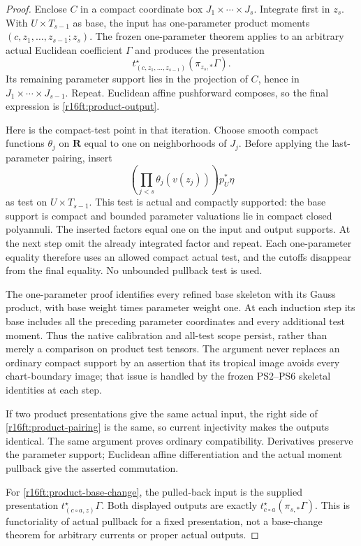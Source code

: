 \begin{proof}
Enclose $C$ in a compact coordinate box $J_1\times\cdots\times J_s$.
Integrate first in $z_s$. With $U\times T_{s-1}$ as base, the input has
one-parameter product moments $(c,z_1,\ldots,z_{s-1};z_s)$.
The frozen one-parameter theorem applies to an arbitrary actual
Euclidean coefficient $\Gamma$ and produces the presentation
\[
 t_{(c,z_1,\ldots,z_{s-1})}^\star(\pi_{z_s,*}\Gamma).
\]
Its remaining parameter support lies in the projection of $C$, hence
in $J_1\times\cdots\times J_{s-1}$. Repeat. Euclidean affine
pushforward composes, so the final expression is
\eqref{r16ft:product-output}.

Here is the compact-test point in that iteration. Choose smooth compact
functions $\theta_j$ on $\mathbf R$ equal to one on neighborhoods of
$J_j$. Before applying the last-parameter pairing, insert
\[
 \left(\prod_{j<s}\theta_j(v(z_j))\right)p_U^*\eta
\]
as test on $U\times T_{s-1}$. This test is actual and compactly
supported: the base support is compact and bounded parameter valuations
lie in compact closed polyannuli. The inserted factors equal one on
the input and output supports. At the next step omit the already
integrated factor and repeat. Each one-parameter equality therefore
uses an allowed compact actual test, and the cutoffs disappear from
the final equality. No unbounded pullback test is used.

The one-parameter proof identifies every refined base skeleton with
its Gauss product, with base weight times parameter weight one. At
each induction step its base includes all the preceding parameter
coordinates and every additional test moment. Thus the native
calibration and all-test scope persist, rather than merely a comparison
on product test tensors. The argument never replaces an ordinary
compact support by an assertion that its tropical image avoids every
chart-boundary image; that issue is handled by the frozen PS2--PS6
skeletal identities at each step.

If two product presentations give the same actual input, the right
side of \eqref{r16ft:product-pairing} is the same, so current
injectivity makes the outputs identical. The same argument proves
ordinary compatibility. Derivatives preserve the parameter support;
Euclidean affine differentiation and the actual moment pullback give
the asserted commutation.

For \eqref{r16ft:product-base-change}, the pulled-back input is the
supplied presentation $t_{(c\circ a,z)}^\star\Gamma$. Both displayed
outputs are exactly $t_{c\circ a}^\star(\pi_{s,*}\Gamma)$. This is
functoriality of actual pullback for a fixed presentation, not a
base-change theorem for arbitrary currents or proper actual outputs.
\end{proof}

